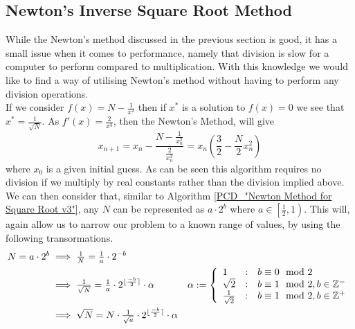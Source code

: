\subsection{Newton's Inverse Square Root Method}
\label{SUB_"Newton's Inverse Square Root Method"}

\theoremstyle{plain}
\newtheorem{Inv Sqrt Quad Conv}{Proposition}[subsection]

While the Newton's method discussed in the previous section is good, it has a small issue when it comes to performance, namely that division is slow for a computer to perform compared to multiplication. With this knowledge we would like to find a way of utilising Newton's method without having to perform any division operations.\\

If we consider \(f(x) = N - \frac{1}{x^2}\) then if \(x^\ast\) is a solution to \(f(x) = 0\) we see that \(x^\ast = \frac{1}{\sqrt{N}}\). As \(f'(x) = \frac{2}{x^3}\), then the Newton's Method, will give \[x_{n+1} = x_n - \frac{N - \frac{1}{x_n^2}}{\frac{2}{x_n^3}} = x_n\left(\frac{3}{2} - \frac{N}{2}x_n^2\right)\] where \(x_0\) is a given initial guess. As can be seen this algorithm requires no division if we multiply by real constants rather than the division implied above.\\

We can then consider that, similar to Algorithm \ref{PCD_"Newton Method for Square Root v3"}, any \(N\) can be represented as \(a \cdot 2^b\) where \(a \in \left[\tfrac{1}{2}, 1\right)\). This will, again allow us to narrow our problem to a known range of values, by using the following transormations.
\begin{displaymath}
\begin{align*}
N = a \cdot 2^b &\implies \tfrac{1}{N} = \tfrac{1}{a} \cdot 2^{-b}\\
	&\implies \tfrac{1}{\sqrt{N}} = \tfrac{1}{a}\cdot2^{\lfloor\frac{-b}{2}\rceil} \cdot \alpha
		&\alpha := \left\{
			\begin{array}{lcl}
				1 & : & b \equiv 0 \mod 2\\
				\sqrt{2} & : & b \equiv 1 \mod 2, b \in \mathbb{Z}^-\\
				\frac{1}{\sqrt{2}} & : & b \equiv 1 \mod 2, b \in \mathbb{Z}^+\\
			\end{array}\right.\\
	& \implies \sqrt{N} = N \cdot \tfrac{1}{\sqrt{a}} \cdot 2^{\lfloor\frac{-b}{2}\rceil} \cdot \alpha
\end{align*}
\end{displaymath}

